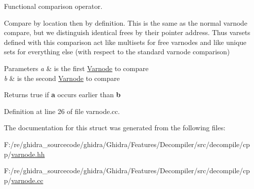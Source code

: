 Functional comparison operator. 

Compare by location then by definition. This is the same as the normal varnode compare, but we distinguish identical frees by their pointer address. Thus varsets defined with this comparison act like multisets for free varnodes and like unique sets for everything else (with respect to the standard varnode comparison) 
\begin{DoxyParams}{Parameters}
{\em a} & is the first \mbox{\hyperlink{class_varnode}{Varnode}} to compare \\
\hline
{\em b} & is the second \mbox{\hyperlink{class_varnode}{Varnode}} to compare \\
\hline
\end{DoxyParams}
\begin{DoxyReturn}{Returns}
true if {\bfseries{a}} occurs earlier than {\bfseries{b}} 
\end{DoxyReturn}


Definition at line 26 of file varnode.\+cc.



The documentation for this struct was generated from the following files\+:\begin{DoxyCompactItemize}
\item 
F\+:/re/ghidra\+\_\+sourcecode/ghidra/\+Ghidra/\+Features/\+Decompiler/src/decompile/cpp/\mbox{\hyperlink{varnode_8hh}{varnode.\+hh}}\item 
F\+:/re/ghidra\+\_\+sourcecode/ghidra/\+Ghidra/\+Features/\+Decompiler/src/decompile/cpp/\mbox{\hyperlink{varnode_8cc}{varnode.\+cc}}\end{DoxyCompactItemize}
